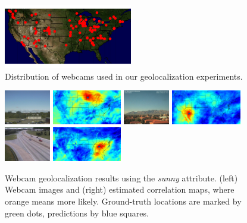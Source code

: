 \documentclass[10pt,twocolumn,letterpaper]{article}
\begin{document}
\begin{figure}[t]
	\centering
		\includegraphics[width=0.5\textwidth, trim= 0mm 5mm 0mm 0mm]{figs/geoloc/webcam_dist}
		\caption{Distribution of webcams used in our geolocalization experiments.}
		\label{fig:webcamdist}
\end{figure}

\begin{figure}
	\centering
		\includegraphics[width=0.18\textwidth]{figs/geoloc/297}
		\includegraphics[width=0.27\textwidth]{figs/geoloc/geoloc_8_297}
		\includegraphics[width=0.18\textwidth]{figs/geoloc/5207}
		\includegraphics[width=0.27\textwidth]{figs/geoloc/geoloc_24_5207}
		\includegraphics[width=0.18\textwidth]{figs/geoloc/23573}
		\includegraphics[width=0.27\textwidth]{figs/geoloc/geoloc_152_23573}
		\caption{Webcam geolocalization results using the
          \textit{sunny} attribute. (left) Webcam images and (right)
          estimated correlation maps, where orange 
          means more likely. Ground-truth locations are marked
          by green dots, predictions by blue squares.}
		\label{fig:geoloc}
\end{figure}
\end{document}
